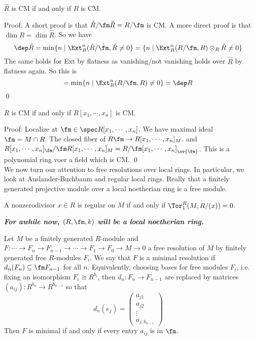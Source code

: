 \begin{cor}
$\hat{R}$ is CM if and only if $R$ is CM.
\end{cor}

\noindent Proof: A short proof is that $\hat{R}/\fm \hat{R}=R/\fm$ is CM. A more direct proof is that $\dim R=\dim \hat{R}$. So we have
\[
\dep \hat{R}=\min\{n\;|\; \Ext_R^n(\hat{R}/\hat{\fm},\hat{R}\neq0 \}=\{n\;|\; \Ext_R^n(R/\fm,R) \otimes_R \hat{R}\neq 0\}
\]
The same holds for Ext by flatness as vanishing/not vanishing holds over $\hat{R}$ by flatness again. So this is 
\[
= \min\{n\;|\; \Ext_R^n(R/\fm,R) \neq 0\}=\dep R
\]
\qed \\

\begin{cor}
$R$ is CM if and only if $R[x_1,\cdots,x_n]$ is CM.
\end{cor}

\noindent Proof: Localize at $\fm \in \spec R[x_1,\cdots,x_n]$. We have maximal ideal $\fm=M \cap R$. The closed fiber of $R\fm \to R[x_1,\cdots,x_n]_M$. and $R[x_1,\cdots,x_n]_\fm/\fm R[x_1,\cdots,x_n]_M=R/\fm[x_1,\cdots,x_n]_{\ov{\fm}}$. This is a polynomial ring voer a field which is CM. \qed \\

We now turn our attention to free resolutions over local rings. In particular, we look at Auslander-Buchbaum and regular local rings. Really that a finitely generated projective module over a local noetherian ring is a free module. 

\begin{ex}
A nonzerodivisor $x \in R$ is regular on $M$ if and only if $\Tor_1^R(M,R/(x))=0$.
\end{ex}

\textbf{\emph{For awhile now, $(R,\fm,k)$ will be a local noetherian ring.}}

\begin{dfn}
Let $M$ be a finitely generated $R$-module and $F: \cdots \to F_n \to F_{n-1} \to \cdots \to F_1 \to F_0 \to M \to 0$ a free resolution of $M$ by finitely generated free $R$-modules $F_i$. We say that $F$ is a minimal resolution if $d_n(F_n) \subseteq \fm F_{n-1}$ for all $n$. Equivalently, choosing bases for free modules $F_i$, i.e. fixing an isomorphism $F_i \cong R^{b_i}$, then $d_n: F_n \to F_{n-1}$ are replaced by matrices $(a_{ij}): R^{b_n} \to R^{b_{n-1}}$ so that
\[
d_n(e_j)= \begin{pmatrix} a_{j1} \\ a_{j2} \\ \vdots \\ a_{j,b_{n-1}} \end{pmatrix}
\]
Then $F$ is minimal if and only if every entry $a_{ij}$ is in $\fm$. 
\end{dfn}

